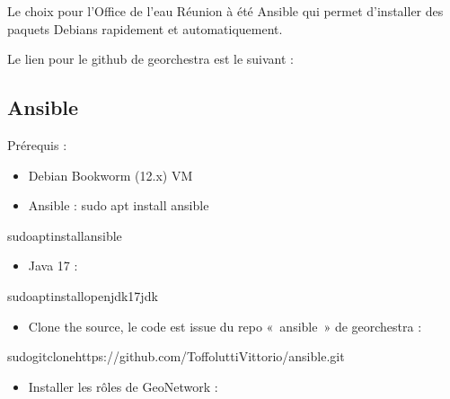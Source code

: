 \documentclass[letterpaper,10pt,french]{sphinxmanual}
\begin{document}
\sphinxAtStartPar
Le choix pour l’Office de l’eau Réunion à été Ansible qui permet d’installer des paquets Debians rapidement et automatiquement.

\sphinxAtStartPar
Le lien pour le github de georchestra est le suivant : 


\subsection{Ansible}
\label{\detokenize{doc_instal/installation:ansible}}
\sphinxAtStartPar
Prérequis :
\begin{itemize}
\item {} 
\sphinxAtStartPar
Debian Bookworm (12.x) VM

\item {} 
\sphinxAtStartPar
Ansible : sudo apt install ansible

\end{itemize}

\begin{sphinxVerbatim}[commandchars=\\\{\}]
sudoaptinstallansible
\end{sphinxVerbatim}
\begin{itemize}
\item {} 
\sphinxAtStartPar
Java 17 :

\end{itemize}

\begin{sphinxVerbatim}[commandchars=\\\{\}]
sudoaptinstallopenjdk\PYGZhy{}17\PYGZhy{}jdk
\end{sphinxVerbatim}
\begin{itemize}
\item {} 
\sphinxAtStartPar
Clone the source, le code est issue du repo « ansible » de georchestra :

\end{itemize}

\begin{sphinxVerbatim}[commandchars=\\\{\}]
sudogitclonehttps://github.com/ToffoluttiVittorio/ansible.git
\end{sphinxVerbatim}
\begin{itemize}
\item {} 
\sphinxAtStartPar
Installer les rôles de GeoNetwork :

\end{itemize}
\end{document}
